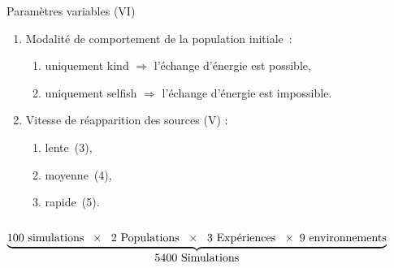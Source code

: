 \documentclass[8pt,handout]{beamer}
\begin{document}
\begin{frame}{}
\begin{columns}[t]
\begin{block}{Paramètres variables (VI)}
\begin{enumerate}
  \item Modalité de comportement de la population initiale : 
    \begin{enumerate}[a -]%
    \item uniquement kind $\Rightarrow $ l'échange d'énergie est possible,
    \item uniquement selfish $\Rightarrow $ l'échange d'énergie est impossible.			%
   \end{enumerate}
  \item Vitesse de réapparition des sources (V) : 
  \begin{enumerate}[a -]
    \item lente~(3), 
    \item moyenne~(4), 
    \item rapide~(5).

  \end{enumerate}
\end{enumerate}
\end{block}



\end{columns}
\centering

$ \underbrace{ \mbox{100 simulations\;}\; \times \; \mbox{ 2 Populations } \; \times \; \mbox{ 3 Expériences }  \; \times \; \mbox{9 environnements}}_{\mbox{5400 Simulations}} $
	


\end{frame}
\end{document}
